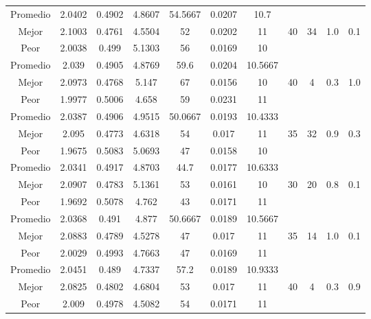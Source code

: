 \begin{table}[h!]
\begin{center}
\begin{tabular}{|c|c|c|c|c|c|c|c|c|c|c|}
        \hline
        \hline
            Promedio  & 2.0402 & 0.4902 & 4.8607 & 54.5667 & 0.0207 & 10.7 &  &  &  & \\
            \cline{1-7}
            Mejor & 2.1003 & 0.4761  & 4.5504 & 52 & 0.0202 & 11 & 40 & 34 & 1.0 & 0.1\\
            \cline{1-7}
            Peor & 2.0038 & 0.499  & 5.1303 & 56 & 0.0169 & 10 &  &  &  & \\
        \hline
        \hline
            Promedio  & 2.039 & 0.4905 & 4.8769 & 59.6 & 0.0204 & 10.5667 &  &  &  & \\
            \cline{1-7}
            Mejor & 2.0973 & 0.4768  & 5.147 & 67 & 0.0156 & 10 & 40 & 4 & 0.3 & 1.0\\
            \cline{1-7}
            Peor & 1.9977 & 0.5006  & 4.658 & 59 & 0.0231 & 11 &  &  &  & \\
        \hline
        \hline
            Promedio  & 2.0387 & 0.4906 & 4.9515 & 50.0667 & 0.0193 & 10.4333 &  &  &  & \\
            \cline{1-7}
            Mejor & 2.095 & 0.4773  & 4.6318 & 54 & 0.017 & 11 & 35 & 32 & 0.9 & 0.3\\
            \cline{1-7}
            Peor & 1.9675 & 0.5083  & 5.0693 & 47 & 0.0158 & 10 &  &  &  & \\
        \hline
        \hline
            Promedio  & 2.0341 & 0.4917 & 4.8703 & 44.7 & 0.0177 & 10.6333 &  &  &  & \\
            \cline{1-7}
            Mejor & 2.0907 & 0.4783  & 5.1361 & 53 & 0.0161 & 10 & 30 & 20 & 0.8 & 0.1\\
            \cline{1-7}
            Peor & 1.9692 & 0.5078  & 4.762 & 43 & 0.0171 & 11 &  &  &  & \\
        \hline
        \hline
            Promedio  & 2.0368 & 0.491 & 4.877 & 50.6667 & 0.0189 & 10.5667 &  &  &  & \\
            \cline{1-7}
            Mejor & 2.0883 & 0.4789  & 4.5278 & 47 & 0.017 & 11 & 35 & 14 & 1.0 & 0.1\\
            \cline{1-7}
            Peor & 2.0029 & 0.4993  & 4.7663 & 47 & 0.0169 & 11 &  &  &  & \\
        \hline
        \hline
            Promedio  & 2.0451 & 0.489 & 4.7337 & 57.2 & 0.0189 & 10.9333 &  &  &  & \\
            \cline{1-7}
            Mejor & 2.0825 & 0.4802  & 4.6804 & 53 & 0.017 & 11 & 40 & 4 & 0.3 & 0.9\\
            \cline{1-7}
            Peor & 2.009 & 0.4978  & 4.5082 & 54 & 0.0171 & 11 &  &  &  & \\

\end{tabular}
\end{center}
\end{table}
